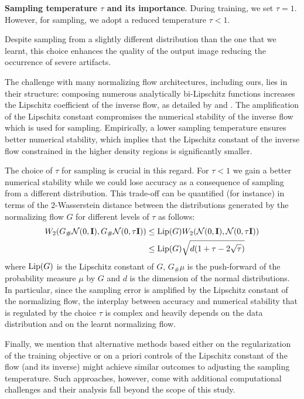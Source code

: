 \textbf{Sampling temperature $\tau$ and its importance}. During training, we set \( \tau = 1 \). However, for sampling, we adopt a reduced temperature \( \tau <1 \).

Despite sampling from a slightly different distribution than the one that we learnt, this choice enhances the quality of the output image reducing the occurrence of severe artifacts.

The challenge with many normalizing flow architectures, including ours, lies in their structure: composing numerous analytically bi-Lipschitz functions increases the Lipschitz coefficient of the inverse flow, as detailed by \cite{behrmann2021understanding} and \cite{verine2023expressivity}. The amplification of the Lipschitz constant compromises the numerical stability of the inverse flow which is used for sampling.
Empirically, a lower sampling temperature ensures better numerical stability, which implies that the Lipschitz constant of the inverse flow constrained in the higher density regions is significantly smaller. 

The choice of $\tau$ for sampling is crucial in this regard. For $\tau < 1$ we gain a better numerical stability while we could lose accuracy as a consequence of sampling from a different distribution. This trade-off can be quantified (for instance) in terms of the $2$-Wasserstein distance between the distributions generated by the normalizing flow $G$ for different levels of $\tau$ as follows: 
\begin{align*}
    W_2(G_\# \mathcal{N}(0,\textbf{I}), G_\# \mathcal{N}(0,\tau \textbf{I})) & \leq {\rm Lip}(G) W_2(\mathcal{N}(0,\textbf{I}), \mathcal{N}(0,\tau \textbf{I})) \\
    & \leq {\rm Lip}(G) \sqrt{d(1 + \tau - 2\sqrt{\tau})}
 \end{align*}
where ${\rm Lip}(G)$ is the Lipschitz constant of $G$, $G_\# \mu$ is the push-forward of the probability measure $\mu$ by $G$ and $d$ is the dimension of the normal distributions. In particular, since the sampling error is amplified by the Lipschitz constant of the normalizing flow, the interplay between accuracy and numerical stability that is regulated by the choice $\tau$ is complex and heavily depends on the data distribution and on the learnt normalizing flow.  

Finally, we mention that alternative methods based either on the regularization of the training objective \cite{onken2021ot} or on a priori controls of the Lipschitz constant of the flow (and its inverse) \cite{verine2023expressivity} might achieve similar outcomes to adjusting the sampling temperature. Such approaches, however, come with additional computational challenges and their analysis fall beyond the scope of this study.

